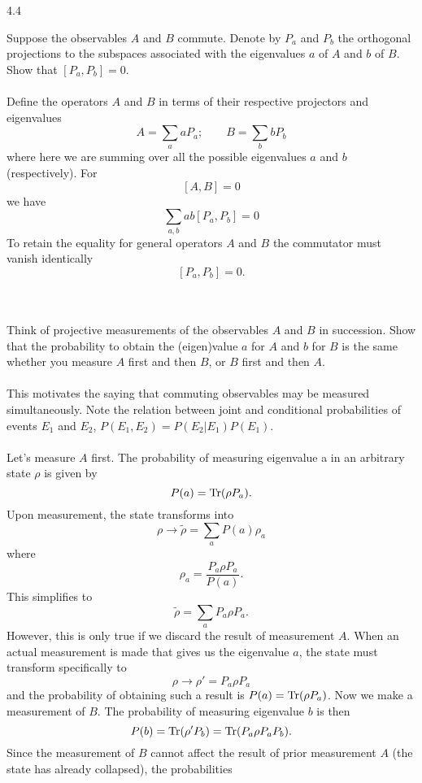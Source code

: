 \documentclass[10pt,letterpaper]{article}
\begin{document}
	\item[4.4]		
	\benum
	\item
	Suppose the observables $A$ and $B$ commute. Denote by $P_a$ and $P_b$ the orthogonal projections
	to the subspaces associated with the eigenvalues $a$ of $A$ and $b$ of $B$. Show that $[P_a,P_b]=0$.
	\\ \\
	Define the operators $A$ and $B$ in terms of their respective projectors and eigenvalues
	\[
		A = \sum_a aP_a;\qquad B = \sum_b bP_b
	\]
	where here we are summing over all the possible eigenvalues $a$ and $b$ (respectively). 
	For
	\[
		[A,B]=0
	\]
	we have
	\[
		\sum_{a,b}ab[P_a,P_b] = 0
	\]
	To retain the equality for general operators $A$ and $B$ the commutator must vanish identically
	\[
		[P_a,P_b] = 0.
	\] \\ \\
	\item
	Think of projective measurements of the observables $A$ and $B$ in succession. Show that the probability to
	obtain the (eigen)value $a$ for $A$ and $b$ for $B$ is the same whether you measure $A$ first and then $B$,
	or $B$ first and then $A$. 
	\\ \\
	This motivates the saying that commuting observables may be measured simultaneously. Note the relation between
	joint and conditional probabilities of events $E_1$ and $E_2$, $P(E_1,E_2) = P(E_2|E_1)P(E_1)$.
	\\ \\
	Let's measure $A$ first. The probability of measuring eigenvalue a in an arbitrary state $\rho$ is given by
	\[
		P(a) = \text{Tr}(\rho P_a).
	\]
	Upon measurement, the state transforms into
	\[
		\rho \to \tilde\rho = \sum_a P(a)\rho_a
	\]
	where
	\[
		\rho_a = \frac{P_a \rho P_a}{P(a)}.
	\]
	This simplifies to
	\[
		\tilde \rho= \sum_a P_a\rho P_a.
	\]
	However, this is only true if we discard the result of measurement $A$. When an actual measurement is made
	that gives us the eigenvalue $a$, the state must transform specifically to 
	\[
		\rho \to\rho' = P_a\rho P_a
	\]
	and the probability of obtaining such a result is $P(a)= \text{Tr}(\rho P_a)$. Now 
	we make a measurement of $B$. The probability of measuring eigenvalue $b$ is then
	\[
		P(b) = \text{Tr}(\rho' P_b) = \text{Tr}(P_a\rho P_aP_b).
	\]
	Since the measurement of $B$ cannot affect the result of prior measurement $A$ (the state has already collapsed), the 		probabilities
\end{document}
